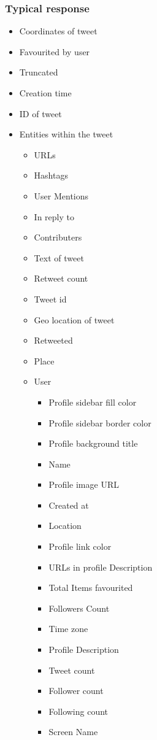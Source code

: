 \documentclass{article}
\begin{document}
	\subsubsection{Typical response}
	\begin{itemize}
		\item Coordinates of tweet
		\item Favourited by user
		\item Truncated
		\item Creation time
		\item ID of tweet
		\item Entities within the tweet
			\begin{itemize}
				\item URLs
				\item Hashtags
				\item User Mentions
				\item In reply to
				\item Contributers
				\item Text of tweet
				\item Retweet count
				\item Tweet id
				\item Geo location of tweet
				\item Retweeted
				\item Place
				\item User
					\begin{itemize}
						\item Profile sidebar fill color
						\item Profile sidebar border color
						\item Profile background title
						\item Name
						\item Profile image URL
						\item Created at
						\item Location
						\item Profile link color
						\item URLs in profile Description
						\item Total Items favourited
						\item Followers Count
						\item Time zone
						\item Profile Description
						\item Tweet count
						\item Follower count
						\item Following count
						\item Screen Name
					\end{itemize}
			\end{itemize}
	\end{itemize}
\end{document}
